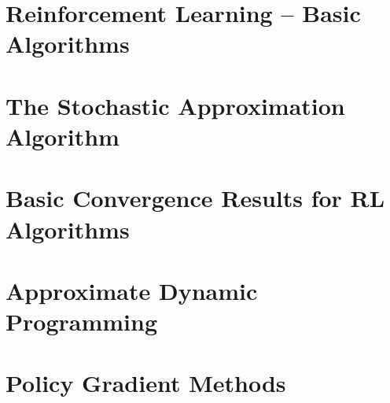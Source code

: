 \documentclass[11pt]{report}
\numberwithin{proposition}{chapter}
\numberwithin{corollary}{chapter}
\numberwithin{assumption}{chapter}
\numberwithin{lemma}{chapter}
\numberwithin{definition}{chapter}
\numberwithin{theorem}{chapter}
\numberwithin{example}{chapter}
\numberwithin{exercise}{chapter}
\numberwithin{remark}{chapter}
\numberwithin{algorithm_}{chapter}
\begin{document}
\chapter{Reinforcement Learning -- Basic Algorithms}



\chapter{The Stochastic Approximation Algorithm}



\chapter{Basic Convergence Results for RL Algorithms}


\chapter{Approximate Dynamic Programming}



\chapter{Policy Gradient Methods}






\end{document}
